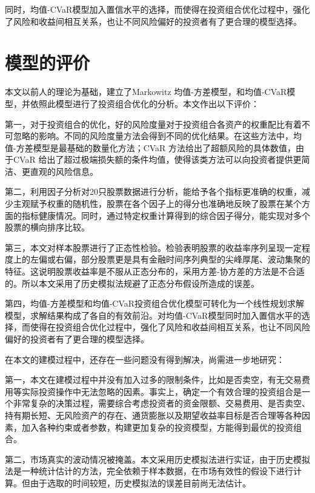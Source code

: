 \documentclass[withoutpreface,bwprint]{cumcmthesis} %
\begin{document}
同时，均值-CVaR模型加入置信水平的选择，而使得在投资组合优化过程中，强化了风险和收益间相互关系，也让不同风险偏好的投资者有了更合理的模型选择。
	
	\section{模型的评价}
	本文以前人的理论为基础，建立了Markowitz 均值-方差模型，和均值-CVaR模型，并依照此模型进行了投资组合优化的分析。本文作出以下评价：
	
	第一，对于投资组合的优化，好的风险度量对于投资组合各资产的权重配比有着不可忽略的影响。不同的风险度量方法会得到不同的优化结果。在这些方法中，均值-方差模型是最基础的数量化方法；CVaR 方法给出了超额风险的具体数值，由于CVaR 给出了超过极端损失额的条件均值，使得该类方法可以向投资者提供更简洁、更直观的风险信息。
	
	第二，利用因子分析对20只股票数据进行分析，能给予各个指标更准确的权重，减少主观赋予权重的随机性，股票在各个因子上的得分也准确地反映了股票在某个方面的指标健康情况。同时，通过特定权重计算得到的综合因子得分，能实现对多个股票的横向排序比较。
	
	第三，本文对样本股票进行了正态性检验。检验表明股票的收益率序列呈现一定程度上的左偏或右偏，部分股票更是具有金融时间序列典型的尖峰厚尾、波动集聚的特征。这说明股票收益率是不服从正态分布的，采用方差-协方差的方法是不合适的。所以本文采用了历史模拟法规避了正态分布假设所造成的误差。
	
	第四，均值-方差模型和均值-CVaR投资组合优化模型可转化为一个线性规划求解模型，求解结果构成了各自的有效前沿。对均值-CVaR模型同时加入置信水平的选择，而使得在投资组合优化过程中，强化了风险和收益间相互关系，也让不同风险偏好的投资者有了更合理的模型选择。

	
	在本文的建模过程中，还存在一些问题没有得到解决，尚需进一步地研究：
	
	第一，本文在建模过程中并没有加入过多的限制条件，比如是否卖空，有无交易费用等实际投资操作中无法忽略的因素。事实上，确定一个有效合理的投资组合是一个非常复杂的决策过程，需要综合考虑投资者的资金限额、交易费用、是否卖空、持有期长短、无风险资产的存在、通货膨胀以及期望收益率目标是否合理等各种因素，加入各种约束或者参数，构建更加复杂的投资模型，方能得到最优的投资组合。
	

	第二，市场真实的波动情况被掩盖。本文采用历史模拟法进行实证，由于历史模拟法是一种统计估计的方法，完全依赖于样本数据，在市场有效性的假设下进行计算。但由于选取的时间较短，历史模拟法的误差目前尚无法估计。
\end{document}
